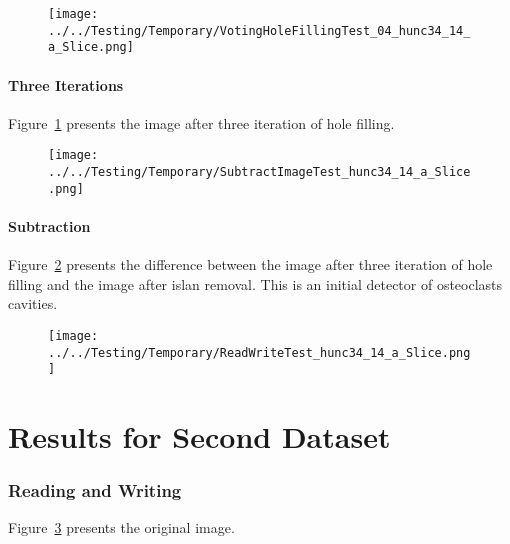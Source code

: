\documentclass{InsightArticle}
\begin{document}
\clearpage
\begin{figure}
\center
\texttt{[image: ../../Testing/Temporary/VotingHoleFillingTest\_04\_hunc34\_14\_a\_Slice.png]}
\label{fig:HoleFillingIteration03Image}
\end{figure}


\subsection{Three Iterations}

Figure~\ref{fig:HoleFillingIteration03Image} presents the image after three iteration of hole filling.



\clearpage
\begin{figure}
\center
\texttt{[image: ../../Testing/Temporary/SubtractImageTest\_hunc34\_14\_a\_Slice.png]}
\label{fig:SubtractionImage}
\end{figure}

\subsection{Subtraction}

Figure~\ref{fig:SubtractionImage} presents the difference between the image
after three iteration of hole filling and the image after islan removal. This
is an initial detector of osteoclasts cavities.


\clearpage
\begin{figure}
\center
\texttt{[image: ../../Testing/Temporary/ReadWriteTest\_hunc34\_14\_a\_Slice.png]}
\label{fig:OriginalImage2}
\end{figure}

\part{Results for Second Dataset}

\section{Reading and Writing}

Figure~\ref{fig:OriginalImage2} presents the original image.
\end{document}
